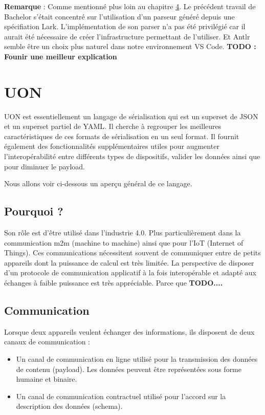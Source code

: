 \documentclass[
    iict, %
    il, %
]{heig-tb}
\begin{document}
\textbf{Remarque} :
Comme mentionné plus loin au chapitre \hyperref[grammar scope]{4}. Le précédent travail de Bachelor s'était concentré sur l'utilisation d'un parseur généré depuis une spécifiation Lark.
L'implémentation de son parser n'a pas été privilégié car il aurait été nécessaire de créer l'infrastructure permettant de l'utiliser.
Et Antlr semble être un choix plus naturel dans notre environnement VS Code.
\textbf{TODO : Founir une meilleur explication}

\section{UON}
UON est essentiellement un langage de sérialisation qui est un superset de JSON et un superset partiel de YAML.
Il cherche à regrouper les meilleures caractéristiques de ces formats de sérialisation en un seul format.
Il fournit également des fonctionnalités supplémentaires utiles pour augmenter l'interopérabilité entre différents types de dispositifs, valider les données ainsi que pour diminuer le payload.

Nous allons voir ci-dessous un aperçu général de ce langage.

\subsection{Pourquoi ?}
Son rôle est d'être utilisé dans l'industrie 4.0. Plus particulièrement dans la communication m2m (machine to machine) ainsi que pour l'IoT (Internet of Things).
Ces communications nécessitent souvent de communiquer entre de petits appareils dont la puissance de calcul est très limitée.
La perspective de disposer d'un protocole de communication applicatif à la fois interopérable et adapté aux échanges à faible puissance est très appréciable.
Parce que \textbf{TODO....}

\subsection{Communication}
Lorsque deux appareils veulent échanger des informations, ils disposent de deux canaux de communication :
\begin{itemize}
    \item Un canal de communication en ligne utilisé pour la transmission des données de contenu (payload). Les données peuvent être représentées sous forme humaine et binaire.
    \item Un canal de communication contractuel utilisé pour l'accord sur la description des données (schema).
\end{itemize}
\end{document}

